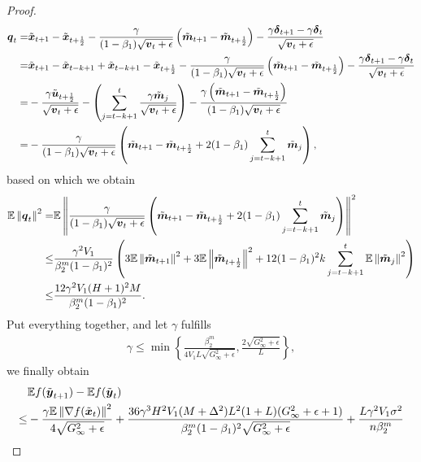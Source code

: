 \begin{proof}
\begin{align*}
    \boldsymbol{q}_t = & \tilde{\boldsymbol{x}}_{t+1} - \tilde{\boldsymbol{x}}_{t+\frac{1}{2}} - \frac{\gamma}{(1- \beta_1)\sqrt{\boldsymbol{v}_t+\epsilon}} \left(\tilde{\boldsymbol{m}}_{t+1} - \tilde{\boldsymbol{m}}_{t+\frac{1}{2}} \right) - \frac{\gamma\boldsymbol{\delta}_{t+1} - \gamma\boldsymbol{\delta}_{t}}{\sqrt{\boldsymbol{v}_t+\epsilon}} \\
= & \tilde{\boldsymbol{x}}_{t+1} - \tilde{\boldsymbol{x}}_{t-k+1} + \tilde{\boldsymbol{x}}_{t-k+1} - \tilde{\boldsymbol{x}}_{t+\frac{1}{2}} - \frac{\gamma}{(1- \beta_1)\sqrt{\boldsymbol{v}_t+\epsilon}} \left(\tilde{\boldsymbol{m}}_{t+1} - \tilde{\boldsymbol{m}}_{t+\frac{1}{2}} \right) - \frac{\gamma\boldsymbol{\delta}_{t+1} - \gamma\boldsymbol{\delta}_{t}}{\sqrt{\boldsymbol{v}_t+\epsilon}} \\
    = & -\frac{\gamma\tilde{\boldsymbol{u}}_{t+\frac{1}{2}}}{\sqrt{\boldsymbol{v}_t+\epsilon}} - \left( \sum_{j=t-k+1}^{t}\frac{\gamma\tilde{\boldsymbol{m}}_j}{\sqrt{\boldsymbol{v}_t+\epsilon}}\right) - \frac{\gamma\left(\tilde{\boldsymbol{m}}_{t+1} - \tilde{\boldsymbol{m}}_{t+\frac{1}{2}} \right)}{(1- \beta_1)\sqrt{\boldsymbol{v}_t+\epsilon}} \\
= & -\frac{\gamma}{(1-\beta_1)\sqrt{\boldsymbol{v}_t+\epsilon}} \left( \tilde{\boldsymbol{m}}_{t+1} - \tilde{\boldsymbol{m}}_{t+\frac{1}{2}}+ 2(1-\beta_1)\sum_{j=t-k+1}^{t}\tilde{\boldsymbol{m}}_j\right),
\end{align*}
based on which we obtain
\begin{align*}
    \mathbb{E} \left\| \boldsymbol{q}_t\right\|^2 = & \mathbb{E} \left\| \frac{\gamma}{(1-\beta_1)\sqrt{\boldsymbol{v}_t+\epsilon}} \left( \tilde{\boldsymbol{m}}_{t+1} - \tilde{\boldsymbol{m}}_{t+\frac{1}{2}} + 2(1-\beta_1)\sum_{j=t-k+1}^{t}\tilde{\boldsymbol{m}}_j\right)\right\|^2 \\
\leq & \frac{\gamma^2V_1}{\beta_2^m(1-\beta_1)^2}\left(3\mathbb{E}\left\| \tilde{\boldsymbol{m}}_{t+1} \right\|^2 + 3\mathbb{E}\left\| \tilde{\boldsymbol{m}}_{t+\frac{1}{2}}\right\|^2 + 12(1-\beta_1)^2k\sum_{j=t-k+1}^{t}\mathbb{E}\left\|\tilde{\boldsymbol{m}}_j\right\|^2\right) \\
    \leq & \frac{12\gamma^2V_1(H+1)^2M}{\beta_2^m(1-\beta_1)^2}.
\end{align*}
Put everything together, and let $\gamma$ fulfills
\begin{align*}
    \gamma \leq \min\left\{\frac{\beta_2^m}{4V_1L\sqrt{G_\infty^2+\epsilon}}, \frac{2\sqrt{G_\infty^2+\epsilon}}{L}\right\},
\end{align*}
we finally obtain
\begin{align*}
    & \mathbb E f(\tilde{\*{y}}_{t+1}) - \mathbb Ef(\tilde{\*{y}}_{t}) \\
\leq & -\frac{\gamma\mathbb E\left\| \nabla f(\tilde{\*{x}}_t) \right\|^2}{4\sqrt{G_\infty^2+\epsilon}}
    + \frac{36\gamma^3H^2V_1(M+\Delta^2)L^2(1+L)(G_\infty^2+\epsilon+1)}{\beta_2^m(1-\beta_1)^2\sqrt{G_\infty^2+\epsilon}} + \frac{L\gamma^2V_1\sigma^2}{n\beta_2^m} \\

\end{align*}
\end{proof}
